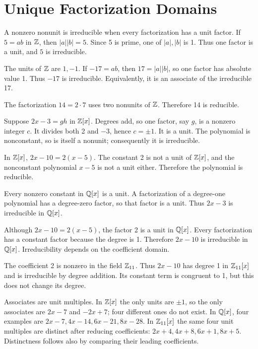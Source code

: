 \section{Unique Factorization Domains}

A nonzero nonunit is irreducible when every factorization has a unit factor. If $5=ab$ in $\mathbb{Z}$, then $|a||b|=5$. Since 5 is prime, one of $|a|,|b|$ is 1. Thus one factor is a unit, and $5$ is irreducible.

The units of $\mathbb{Z}$ are $1,-1$. If $-17=ab$, then $17=|a||b|$, so one factor has absolute value 1. Thus $-17$ is irreducible. Equivalently, it is an associate of the irreducible 17.

The factorization $14=2\cdot7$ uses two nonunits of $\mathbb{Z}$. Therefore 14 is reducible.

Suppose $2x-3=gh$ in $\mathbb{Z}[x]$. Degrees add, so one factor, say $g$, is a nonzero integer $c$. It divides both 2 and $-3$, hence $c=\pm1$. It is a unit. The polynomial is nonconstant, so is itself a nonunit; consequently it is irreducible.

In $\mathbb{Z}[x]$, $2x-10=2(x-5)$. The constant 2 is not a unit of $\mathbb{Z}[x]$, and the nonconstant polynomial $x-5$ is not a unit either. Therefore the polynomial is reducible.

Every nonzero constant in $\mathbb{Q}[x]$ is a unit. A factorization of a degree-one polynomial has a degree-zero factor, so that factor is a unit. Thus $2x-3$ is irreducible in $\mathbb{Q}[x]$.

Although $2x-10=2(x-5)$, the factor 2 is a unit in $\mathbb{Q}[x]$. Every factorization has a constant factor because the degree is 1. Therefore $2x-10$ is irreducible in $\mathbb{Q}[x]$. Irreducibility depends on the coefficient domain.

The coefficient 2 is nonzero in the field $\mathbb{Z}_{11}$. Thus $2x-10$ has degree 1 in $\mathbb{Z}_{11}[x]$ and is irreducible by degree addition. Its constant term is congruent to 1, but this does not change its degree.

Associates are unit multiples. In $\mathbb{Z}[x]$ the only units are $\pm1$, so the only associates are $2x-7$ and $-2x+7$; four different ones do not exist. In $\mathbb{Q}[x]$, four examples are $2x-7,4x-14,6x-21,8x-28$. In $\mathbb{Z}_{11}[x]$ the same four unit multiples are distinct after reducing coefficients: $2x+4,4x+8,6x+1,8x+5$. Distinctness follows also by comparing their leading coefficients.


